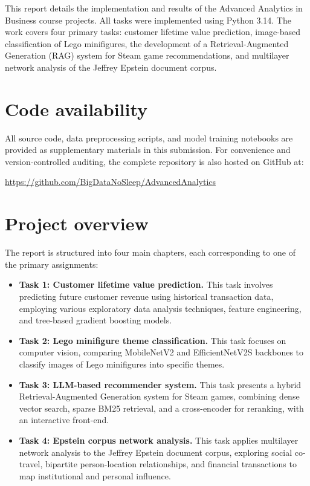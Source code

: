 This report details the implementation and results of the Advanced Analytics in Business course projects. All tasks were implemented using Python 3.14. The work covers four primary tasks: customer lifetime value prediction, image-based classification of Lego minifigures, the development of a Retrieval-Augmented Generation (RAG) system for Steam game recommendations, and multilayer network analysis of the Jeffrey Epstein document corpus.

\section{Code availability}
All source code, data preprocessing scripts, and model training notebooks are provided as supplementary materials in this submission. For convenience and version-controlled auditing, the complete repository is also hosted on GitHub at:
\begin{center}
    \url{https://github.com/BigDataNoSleep/AdvancedAnalytics}
\end{center}

\section{Project overview}
The report is structured into four main chapters, each corresponding to one of the primary assignments:
\begin{itemize}
    \item \textbf{Task 1: Customer lifetime value prediction.} This task involves predicting future customer revenue using historical transaction data, employing various exploratory data analysis techniques, feature engineering, and tree-based gradient boosting models.
    \item \textbf{Task 2: Lego minifigure theme classification.} This task focuses on computer vision, comparing MobileNetV2 and EfficientNetV2S backbones to classify images of Lego minifigures into specific themes.
    \item \textbf{Task 3: LLM-based recommender system.} This task presents a hybrid Retrieval-Augmented Generation system for Steam games, combining dense vector search, sparse BM25 retrieval, and a cross-encoder for reranking, with an interactive front-end.
    \item \textbf{Task 4: Epstein corpus network analysis.} This task applies multilayer network analysis to the Jeffrey Epstein document corpus, exploring social co-travel, bipartite person-location relationships, and financial transactions to map institutional and personal influence.
\end{itemize}
